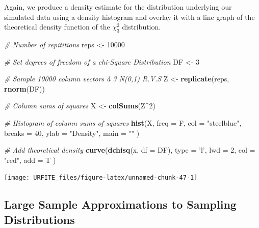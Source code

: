 \documentclass[]{book}
\newenvironment{Shaded}{\begin{snugshade}}{\end{snugshade}}
\newcommand{\KeywordTok}[1]{\textcolor[rgb]{0.13,0.29,0.53}{\textbf{#1}}}
\newcommand{\DataTypeTok}[1]{\textcolor[rgb]{0.13,0.29,0.53}{#1}}
\newcommand{\DecValTok}[1]{\textcolor[rgb]{0.00,0.00,0.81}{#1}}
\newcommand{\StringTok}[1]{\textcolor[rgb]{0.31,0.60,0.02}{#1}}
\newcommand{\CommentTok}[1]{\textcolor[rgb]{0.56,0.35,0.01}{\textit{#1}}}
\newcommand{\OperatorTok}[1]{\textcolor[rgb]{0.81,0.36,0.00}{\textbf{#1}}}
\newcommand{\NormalTok}[1]{#1}
\theoremstyle{definition}
\theoremstyle{definition}
\theoremstyle{definition}
\theoremstyle{remark}
\begin{document}
Again, we produce a density estimate for the distribution underlying our
simulated data using a density histogram and overlay it with a line
graph of the theoretical density function of the \(\chi^2_3\)
distribution.

\begin{Shaded}
\begin{Highlighting}[]
\CommentTok{# Number of repititions}
\NormalTok{reps <-}\StringTok{ }\DecValTok{10000}

\CommentTok{# Set degrees of freedom of a chi-Square Distribution}
\NormalTok{DF <-}\StringTok{ }\DecValTok{3} 

\CommentTok{# Sample 10000 column vectors à 3 N(0,1) R.V.S}
\NormalTok{Z <-}\StringTok{ }\KeywordTok{replicate}\NormalTok{(reps, }\KeywordTok{rnorm}\NormalTok{(DF)) }

\CommentTok{# Column sums of squares}
\NormalTok{X <-}\StringTok{ }\KeywordTok{colSums}\NormalTok{(Z}\OperatorTok{^}\DecValTok{2}\NormalTok{)}

\CommentTok{# Histogram of column sums of squares}
\KeywordTok{hist}\NormalTok{(X, }
     \DataTypeTok{freq =}\NormalTok{ F, }
     \DataTypeTok{col =} \StringTok{"steelblue"}\NormalTok{, }
     \DataTypeTok{breaks =} \DecValTok{40}\NormalTok{, }
     \DataTypeTok{ylab =} \StringTok{"Density"}\NormalTok{, }
     \DataTypeTok{main =} \StringTok{""}
\NormalTok{     )}

\CommentTok{# Add theoretical density}
\KeywordTok{curve}\NormalTok{(}\KeywordTok{dchisq}\NormalTok{(x, }\DataTypeTok{df =}\NormalTok{ DF), }
      \DataTypeTok{type =} \StringTok{'l'}\NormalTok{, }
      \DataTypeTok{lwd =} \DecValTok{2}\NormalTok{, }
      \DataTypeTok{col =} \StringTok{"red"}\NormalTok{, }
      \DataTypeTok{add =}\NormalTok{ T}
\NormalTok{      )}
\end{Highlighting}
\end{Shaded}

\begin{center}\texttt{[image: URFITE\_files/figure-latex/unnamed-chunk-47-1]} \end{center}

\subsection*{Large Sample Approximations to Sampling
Distributions}\label{large-sample-approximations-to-sampling-distributions}
\end{document}
